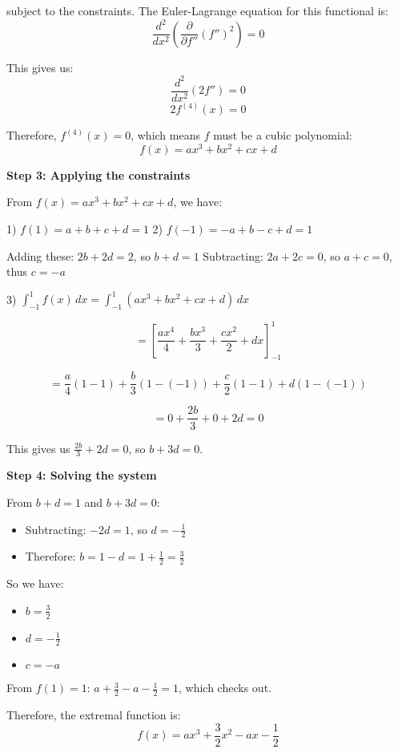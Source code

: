 \documentclass[12pt,a4paper]{article}
\theoremstyle{definition}
\begin{document}
        subject to the constraints. The Euler-Lagrange equation for this functional is:
        $$\frac{d^2}{dx^2}\left(\frac{\partial}{\partial f''} (f'')^2\right) = 0$$

        This gives us:
        $$\frac{d^2}{dx^2}(2f'') = 0$$
        $$2f^{(4)}(x) = 0$$

        Therefore, $f^{(4)}(x) = 0$, which means $f$ must be a cubic polynomial:
        $$f(x) = ax^3 + bx^2 + cx + d$$

        \textbf{Step 3: Applying the constraints}

        From $f(x) = ax^3 + bx^2 + cx + d$, we have:

        1) $f(1) = a + b + c + d = 1$
        2) $f(-1) = -a + b - c + d = 1$

        Adding these: $2b + 2d = 2$, so $b + d = 1$
        Subtracting: $2a + 2c = 0$, so $a + c = 0$, thus $c = -a$

        3) $\int_{-1}^{1} f(x) \, dx = \int_{-1}^{1} (ax^3 + bx^2 + cx + d) \, dx$

        $$= \left[\frac{ax^4}{4} + \frac{bx^3}{3} + \frac{cx^2}{2} + dx\right]_{-1}^{1}$$

        $$= \frac{a}{4}(1-1) + \frac{b}{3}(1-(-1)) + \frac{c}{2}(1-1) + d(1-(-1))$$

        $$= 0 + \frac{2b}{3} + 0 + 2d = 0$$

        This gives us $\frac{2b}{3} + 2d = 0$, so $b + 3d = 0$.

        \textbf{Step 4: Solving the system}

        From $b + d = 1$ and $b + 3d = 0$:
        \begin{itemize}
            \item Subtracting: $-2d = 1$, so $d = -\frac{1}{2}$
            \item Therefore: $b = 1 - d = 1 + \frac{1}{2} = \frac{3}{2}$
        \end{itemize}

        So we have:
        \begin{itemize}
            \item $b = \frac{3}{2}$
            \item $d = -\frac{1}{2}$
            \item $c = -a$
        \end{itemize}

        From $f(1) = 1$: $a + \frac{3}{2} - a - \frac{1}{2} = 1$, which checks out.

        Therefore, the extremal function is:
        $$f(x) = ax^3 + \frac{3}{2}x^2 - ax - \frac{1}{2}$$
\end{document}
